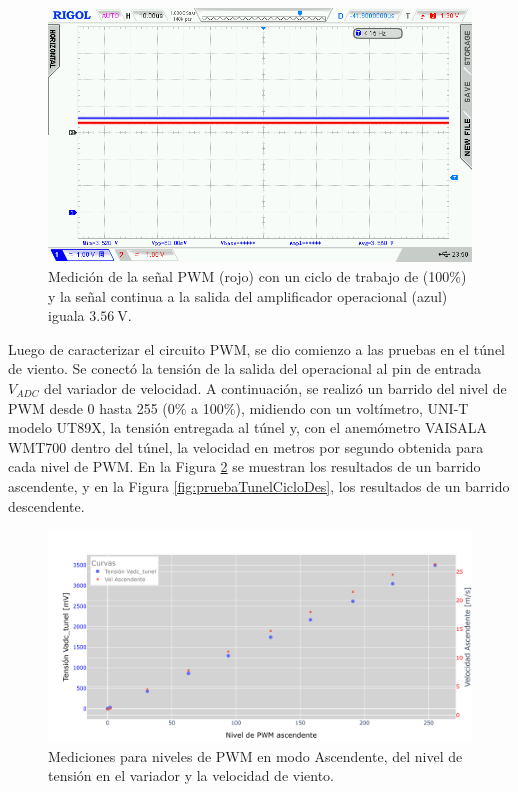 \begin{figure}[H]
    \centering
    \includegraphics[width=0.9\linewidth]{Figuras/datalogger/Hardware/MedicionesPWM/255.png}
    \caption{Medición de la señal PWM (rojo) con un ciclo de trabajo de (100\%) y la señal continua a la salida del amplificador operacional (azul) iguala $\SI{3.56}{\volt}$.}
    \label{fig:255}
\end{figure}
Luego de caracterizar el circuito PWM, se dio comienzo a las pruebas en el túnel de viento. Se conectó la tensión de la salida del operacional al pin de entrada $V_{ADC}$ del variador de velocidad. A continuación, se realizó un barrido del nivel de PWM desde 0 hasta 255 (0\% a 100\%), midiendo con un voltímetro, UNI-T modelo UT89X, la tensión entregada al túnel y, con el anemómetro VAISALA WMT700 dentro del túnel, la velocidad en metros por segundo obtenida para cada nivel de PWM. En la Figura \ref{fig:pruebaTunelCicloAsc} se muestran los resultados de un barrido ascendente, y en la Figura \ref{fig:pruebaTunelCicloDes}, los resultados de un barrido descendente.

\begin{figure}[H]
    \centering
    \includegraphics[width=1\linewidth]{Figuras/datalogger/Hardware/MedicionesPWM/pruebaTunelCicloAsc.png}
    \caption{Mediciones para niveles de PWM en modo Ascendente, del nivel de tensión en el variador y la velocidad de viento.}
    \label{fig:pruebaTunelCicloAsc}
\end{figure}

